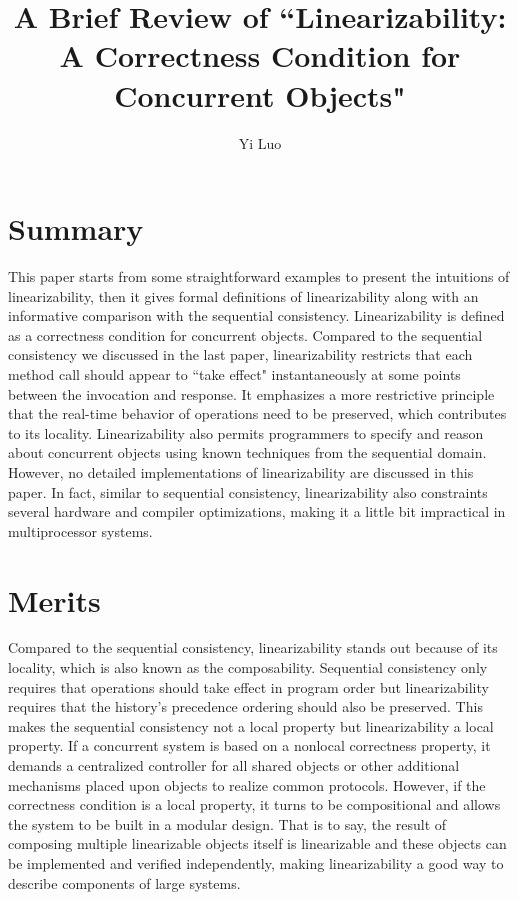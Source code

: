 \documentclass[10pt, letterpaper]{article}
\title{A Brief Review of ``Linearizability: A Correctness Condition for Concurrent Objects"}
\author{Yi Luo}
\date{} %
\begin{document}
\maketitle

\section{Summary}
\label{sec-summary}
This paper starts from some straightforward examples to present the intuitions of linearizability, then it gives formal definitions of linearizability along with an informative comparison with the sequential consistency. Linearizability is defined as a correctness condition for concurrent objects. Compared to the sequential consistency we discussed in the last paper, linearizability restricts that each method call should appear to ``take effect" instantaneously at some points between the invocation and response. It emphasizes a more restrictive principle that the real-time behavior of operations need to be preserved, which contributes to its locality. Linearizability also permits programmers to specify and reason about concurrent objects using known techniques from the sequential domain. However, no detailed implementations of linearizability are discussed in this paper. In fact, similar to sequential consistency, linearizability also constraints several hardware and compiler optimizations, making it a little bit impractical in multiprocessor systems.~\cite{herlihyLACCCO1990}
\section{Merits}
\label{sec-merits}
Compared to the sequential consistency, linearizability stands out because of its locality, which is also known as the composability. Sequential consistency only requires that operations should take effect in program order but linearizability requires that the history's precedence ordering should also be preserved. This makes the sequential consistency not a local property but linearizability a local property. If a concurrent system is based on a nonlocal correctness property, it demands a centralized controller for all shared objects or other additional mechanisms placed upon objects to realize common protocols. However, if the correctness condition is a local property, it turns to be compositional and allows the system to be built in a modular design. That is to say, the result of composing multiple linearizable objects itself is linearizable and these objects can be implemented and verified independently, making linearizability a good way to describe components of large systems.
\end{document}
